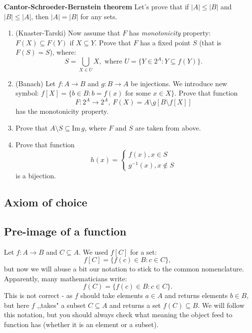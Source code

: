 \begin{prob}
	\textbf{Cantor-Schroeder-Bernstein theorem} Let's prove that if $|A|\le|B|$ and $|B|\le |A|$, then $|A|=|B|$ for any sets.
	\begin{enumerate}
		\item (Knaster-Tarski) Now assume that $F$ has \textit{monotonicity} property: $F(X)\subseteq F(Y)$ if $X\subseteq Y$.
			Prove that $F$ has a fixed point $S$ (that is $F(S)=S$), where:
			$$S=\bigcup_{X\in U} X, \text{~where~} U= \{Y\in 2^A : Y\subseteq f(Y)\}.$$
		\item (Banach) Let $f: A\to B$ and $g:B\to A$ be injections.
			We introduce new symbol: $f[X]=\{b\in B : b=f(x) \text{ for some } x\in X\}$. Prove that
			function $$F:2^A\to 2^A,~F(X)=A\setminus g[B\setminus f[X]]$$
			has the monotonicity property.
    \item Prove that $A\setminus S\subseteq \text{Im}\,g$, where
      $F$ and $S$ are taken from above.
		\item Prove that function
			$$h(x) =
				\begin{cases}
					f(x), x\in S\\
					g^{-1}(x), x \notin S
				\end{cases}
			 $$
			 is a bijection.
	\end{enumerate}
\end{prob}

\subsection{Axiom of choice}



\subsection{Pre-image of a function}
Let $f:A\to B$ and $C\subseteq A$. We used $f[C]$ for a set:
$$f[C] = \{ f(c) \in B : c\in C\},$$
but now we will abuse a bit our notation to stick to
the common nomenclature. Apparently, many mathematicians write:
$$f(C) = \{ f(c) \in B : c\in C\}.$$
This is not correct - as $f$ should take elements
$a\in A$ and returns elements $b\in B$, but here $f$ ,,takes"
a subset $C\subseteq A$ and returns a set $f(C)\subseteq B$. We will
follow this notation, but you should always check what meaning
the object feed to function has (whether it is an element or a subset).

